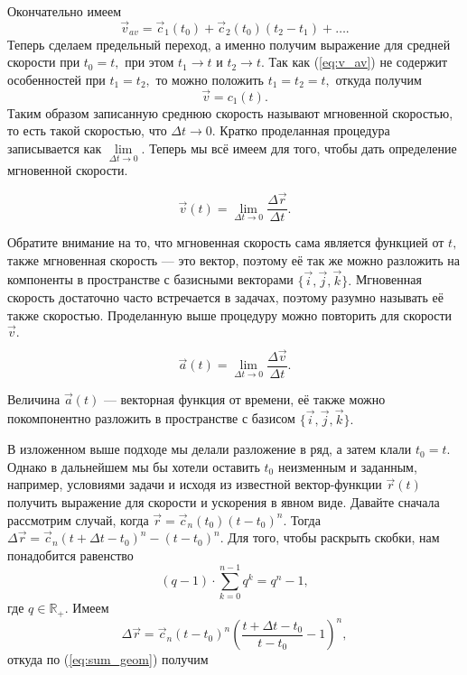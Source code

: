 Окончательно имеем
\begin{equation}
\vec{v}_{av} = \vec{c}_1(t_0) + \vec{c}_2(t_0)(t_2-t_1) +  \ldots.
\label{eq:v_av}
\end{equation}
Теперь сделаем предельный переход, а именно получим выражение для средней
скорости при $t_0 = t,$ при этом $t_1 \to t$ и $t_2 \to t.$ Так как
(\ref{eq:v_av}) не содержит особенностей при $t_1 = t_2,$ то можно
положить $t_1 = t_2 = t,$ откуда получим
$$\vec{v} = c_1 (t).$$
Таким образом записанную среднюю скорость называют мгновенной скоростью, то есть
такой скоростью, что $\Delta t \to 0.$ 
Кратко проделанная процедура записывается
как $\lim\limits_{\Delta t \to 0}.$ 
Теперь мы всё имеем для того, чтобы дать определение
мгновенной скорости.
\begin{definition}
$$\vec{v}(t) = \lim\limits_{\Delta t \to 0} \frac {\Delta \vec{r}}{\Delta t}.$$
\end{definition}
Обратите внимание на то, что мгновенная скорость
сама является функцией от $t,$ также мгновенная скорость --- это вектор, поэтому
её так же можно разложить на компоненты в пространстве с базисными векторами $\{\vec{i},\vec{j},\vec{k}\}.$
Мгновенная скорость достаточно часто встречается в задачах, поэтому разумно
называть её также скоростью.
Проделанную выше процедуру можно повторить для скорости $\vec{v}.$
\begin{definition}[Ускорение]
$$\vec{a}(t) = \lim\limits_{\Delta t \to 0} \frac {\Delta \vec{v}}{\Delta t}.$$
\end{definition}
Величина $\vec{a}(t)$ --- векторная функция от времени, её также можно покомпонентно разложить
в пространстве с базисом $\{\vec{i}, \vec{j}, \vec{k}\}.$
\par
В изложенном выше подходе мы делали разложение в ряд, а затем клали  $t_0 = t.$ Однако в дальнейшем
мы бы хотели оставить $t_0$ неизменным и заданным, например, условиями задачи и исходя
из известной вектор-функции $\vec{r}(t)$ получить выражение для скорости и ускорения в явном
виде. Давайте сначала рассмотрим случай, когда $\vec{r} = \vec{c}_n (t_0) (t-t_0)^n.$
Тогда $\Delta \vec{r} = \vec{c}_n (t+\Delta t -t_0)^n-(t-t_0)^n.$ Для того, чтобы
раскрыть скобки, нам понадобится равенство 
\begin{equation}
(q-1)\cdot \sum\limits_{k=0}^{n-1}q^k = q^n-1,
\label{eq:sum_geom}
\end{equation}
где $q \in \mathbb{R}_+.$ Имеем
$$\Delta \vec{r} = \vec{c}_n (t-t_0)^n\left(\frac{t+\Delta t-t_0}{t-t_0} - 1\right)^n,$$
откуда по (\ref{eq:sum_geom}) получим
